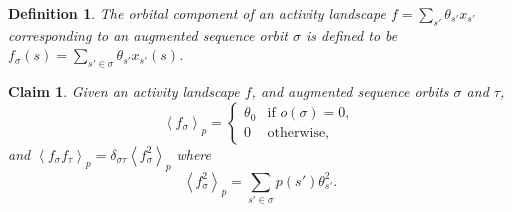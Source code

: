 \documentclass{article}
\numberwithin{myclaim}{section}
\newcommand{\braket}[1]{\left\langle #1 \right\rangle}
\newtheorem{claim}{Claim}
\newtheorem{definition}{Definition}
\begin{document}
\begin{definition}
The orbital component of an activity landscape $f = \sum_{s'} \theta_{s'} x_{s'}$ corresponding to an augmented sequence orbit $\sigma$ is defined to be $f_\sigma(s) = \sum_{s' \in \sigma} \theta_{s'} x_{s'}(s)$. 
\end{definition}

\begin{claim} \label{claim:orbital_marginal_components}
Given an activity landscape $f$, and augmented sequence orbits $\sigma$ and $\tau$,
\begin{equation}
	\braket{f_\sigma}_p = \left\{ 
	\begin{array}{cl}
		\theta_0 & \textrm{if $o(\sigma) = 0$}, \\
		0 & \textrm{otherwise},
	\end{array} 
	\right. \label{eq:first_order_orbital_marginals}
\end{equation} 
and $\braket{f_\sigma f_\tau}_p = \delta_{\sigma \tau} \braket{f_\sigma^2}_p$ where
\begin{equation}
	\braket{f_\sigma^2}_p = \sum_{s' \in \sigma} p(s') \theta^2_{s'}.
\end{equation}
\end{claim}
\end{document}
